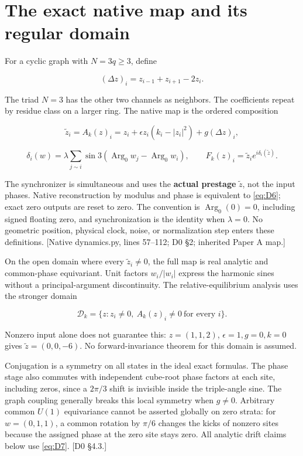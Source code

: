 \documentclass[11pt,a4paper]{article}
\begin{document}
\section{The exact native map and its regular domain}

For a cyclic graph with \(N=3q\ge3\), define

\[
(\Delta z)_i=z_{i-1}+z_{i+1}-2z_i.
\]

The triad \(N=3\) has the other two channels as neighbors. The coefficients repeat by residue class on a larger ring. The native map is the ordered composition

\[
\widetilde z_i=A_k(z)_i
=z_i+\epsilon z_i(k_i-|z_i|^2)+g(\Delta z)_i,
\tag{D5}\label{eq:D5}
\]

\[
\delta_i(w)=\lambda\sum_{j\sim i}
\sin 3(\operatorname{Arg}_0 w_j-\operatorname{Arg}_0 w_i),
\qquad F_k(z)_i=\widetilde z_i e^{i\delta_i(\widetilde z)}.
\tag{D6}\label{eq:D6}
\]

The synchronizer is simultaneous and uses the \textbf{actual prestage} \(\widetilde z\), not the input phases. Native reconstruction by modulus and phase is equivalent to \eqref{eq:D6}; exact zero outputs are reset to zero. The convention is \(\operatorname{Arg}_0(0)=0\), including signed floating zero, and synchronization is the identity when \(\lambda=0\). No geometric position, physical clock, noise, or normalization step enters these definitions. [Native dynamics.py, lines 57--112; D0 \S{}2; inherited Paper A map.]

On the open domain where every \(\widetilde z_i\ne0\), the full map is real analytic and common-phase equivariant. Unit factors \(w_i/|w_i|\) express the harmonic sines without a principal-argument discontinuity. The relative-equilibrium analysis uses the stronger domain

\[
\mathcal D_k=\{z:z_i\ne0,\ A_k(z)_i\ne0\ \text{for every }i\}.
\tag{D7}\label{eq:D7}
\]

Nonzero input alone does not guarantee this: \(z=(1,1,2)\), \(\epsilon=1,g=0,k=0\) gives \(\widetilde z=(0,0,-6)\). No forward-invariance theorem for this domain is assumed.

Conjugation is a symmetry on all states in the ideal exact formulas. The phase stage also commutes with independent cube-root phase factors at each site, including zeros, since a \(2\pi/3\) shift is invisible inside the triple-angle sine. The graph coupling generally breaks this local symmetry when \(g\ne0\). Arbitrary common \(U(1)\) equivariance cannot be asserted globally on zero strata: for \(w=(0,1,1)\), a common rotation by \(\pi/6\) changes the kicks of nonzero sites because the assigned phase at the zero site stays zero. All analytic drift claims below use \eqref{eq:D7}. [D0 \S{}4.3.]
\end{document}
